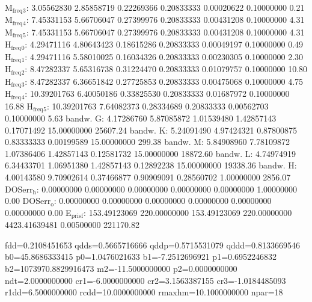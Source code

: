 \documentclass[11pt]{article}
\begin{document}
M\(_{\text{freq}}\)\(_{\text{3}}\):   3.05562830   2.85858719   0.22269366   0.20833333   0.00020622   0.10000000         0.21
M\(_{\text{freq}}\)\(_{\text{4}}\):   7.45331153   5.66706047   0.27399976   0.20833333   0.00431208   0.10000000         4.31
M\(_{\text{freq}}\)\(_{\text{5}}\):   7.45331153   5.66706047   0.27399976   0.20833333   0.00431208   0.10000000         4.31
H\(_{\text{freq}}\)\(_{\text{0}}\):   4.29471116   4.80643423   0.18615286   0.20833333   0.00049197   0.10000000         0.49
H\(_{\text{freq}}\)\(_{\text{1}}\):   4.29471116   5.58010025   0.16034326   0.20833333   0.00230305   0.10000000         2.30
H\(_{\text{freq}}\)\(_{\text{2}}\):   8.47282337   5.65316738   0.31224470   0.20833333   0.01079757   0.10000000        10.80
H\(_{\text{freq}}\)\(_{\text{3}}\):   8.47282337   6.36651842   0.27725853   0.20833333   0.00475068   0.10000000         4.75
H\(_{\text{freq}}\)\(_{\text{4}}\):  10.39201763   6.40050186   0.33825530   0.20833333   0.01687972   0.10000000        16.88
H\(_{\text{freq}}\)\(_{\text{5}}\):  10.39201763   7.64082373   0.28334689   0.20833333   0.00562703   0.10000000         5.63
bandw. G:   4.17286760   5.87085872   1.01539480   1.42857143   0.17071492  15.00000000     25607.24
bandw. K:   5.24091490   4.97424321   0.87800875   0.83333333   0.00199589  15.00000000       299.38
bandw. M:   5.84908960   7.78109872   1.07386406   1.42857143   0.12581732  15.00000000     18872.60
bandw. L:   4.74974919   6.34433701   1.06951380   1.42857143   0.12892238  15.00000000     19338.36
bandw. H:   4.00143580   9.70902614   0.37466877   0.90909091   0.28560702   1.00000000      2856.07
DOSerr\(_{\text{h}}\):   0.00000000   0.00000000   0.00000000   0.00000000   0.00000000   1.00000000         0.00
DOSerr\(_{\text{o}}\):   0.00000000   0.00000000   0.00000000   0.00000000   0.00000000   0.00000000         0.00
E\(_{\text{pris}}\)\(_{\text{f}}\): 153.49123069 220.00000000 153.49123069 220.00000000 4423.41639481   0.00500000    221170.82

fdd=0.2108451653 qdds=0.5665716666 qddp=0.5715531079 qddd=0.8133669546 b0=45.8686333415 p0=1.0476021633 b1=-7.2512696921 p1=0.6952246832 b2=1073970.8829916473 m2=-11.5000000000 p2=0.0000000000 ndt=2.0000000000 cr1=-6.0000000000 cr2=3.1563387155 cr3=-1.0184485093 r1dd=6.5000000000 rcdd=10.0000000000 rmaxhm=10.1000000000 npar=18 
\end{document}
